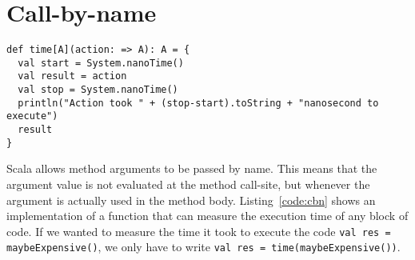 \section{Call-by-name}

\begin{lstlisting}[caption=Call-by-name, label=code:cbn, escapechar=|, float, floatplacement=H]
def time[A](action: => A): A = {
  val start = System.nanoTime()
  val result = action
  val stop = System.nanoTime()
  println("Action took " + (stop-start).toString + "nanosecond to execute")
  result
}
\end{lstlisting}

Scala allows method arguments to be passed by name.
This means that the argument value is not evaluated at the method call-site, but whenever the argument is actually used in the method body.
Listing~\ref{code:cbn} shows an implementation of a function that can measure the execution time of any block of code.
If we wanted to measure the time it took to execute the code \texttt{val res = maybeExpensive()}, we only have to write \texttt{val res = time(maybeExpensive())}.
